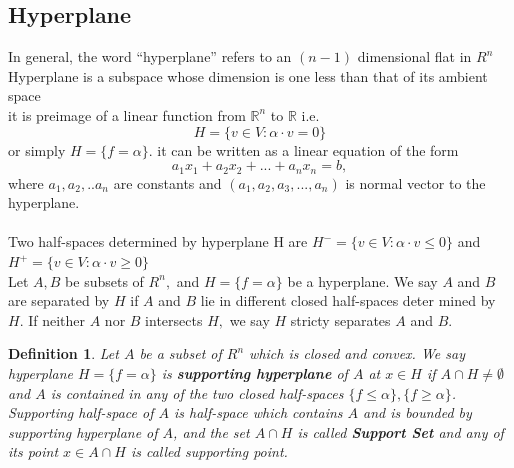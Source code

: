 \documentclass[oneside]{book}
\newtheorem{mydef}{Definition}[section]
\begin{document}
	
	
	
	
	
	
	
	
	\subsection{Hyperplane} 
	\label{ss:9}
	In general, the word “hyperplane” refers to an $( n-1 )$ dimensional flat in $R^{n}$ \\
	Hyperplane is a subspace whose dimension is one less than that of its ambient space  
	\\ it is preimage of a  linear function from $\mathbb{R}^{n}$ to $\mathbb{R}$ i.e.
	\begin{equation}
	H=\{v \in V: \alpha \cdot v=0\} 
	\end{equation}  
	or simply  $H = \{f = \alpha \}$. 
	it can be written    as  a linear equation of the form
	$$a_1x_1 + a_2x_2 + ... + a_nx_n = b,$$ where $a_1,a_2,..a_n$ are constants and $(a_1,a_2,a_3,...,a_n)$ is normal vector to the hyperplane.
	\\\\
	Two half-spaces  determined by hyperplane H are 
	$H^{-}=\{v \in V: \alpha \cdot v \leq 0\}$ and  $ H^{+}=\{v \in V: \alpha \cdot v \geq 0\} $ 
	\\
	Let $A, B$ be subsets of $R^{n},$ and $H=\{f=\alpha\}$ be a hyperplane. We say $A$ and
	$B$ are separated by $H$ if $A$ and $B$ lie in different closed half-spaces deter
	mined by $H .$ If neither $A$ nor $B$ intersects $H,$ we say $H$ stricty separates $A$
	and $B .$\\
	
	
	
	
	
	\begin{mydef} \label{d:3}
		Let $A$ be a subset of $R^{n}$ which is closed and convex. We say hyperplane  $H=\{f=\alpha\}$ is \textbf{supporting hyperplane} of $A$ at  $x \in H$  if $A \cap H \neq \emptyset$ and $A$ is contained in any of the two closed half-spaces $\{f \leq \alpha\}, \{f \geq \alpha\}$.
		\\
		Supporting half-space of $A$ is half-space which contains $A$ and is bounded by supporting hyperplane of $A$, and the set $A \cap H$ is called \textbf{Support Set} and any of its point $x \in A \cap H$ is called supporting point.
	\end{mydef}
	
	
	
	
\end{document}
